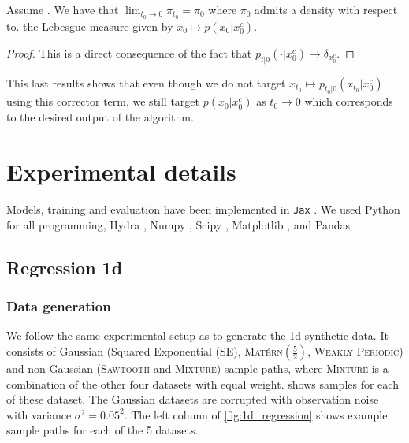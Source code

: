 \begin{proposition}
	Assume \textup{}.
	We have that $\lim_{t_0 \to 0} \pi_{t_0} = \pi_0$ where $\pi_0$ admits a density with respect to.
	the Lebesgue measure given by $x_0 \mapsto p(x_0|x_0^c)$.
\end{proposition}

\begin{proof}
	This is a direct consequence of the fact that $p_{t|0}(\cdot|x_0^c) \to \delta_{x_0^c}$.
\end{proof}

This last results shows that even though we do not target $x_{t_0} \mapsto p_{t_0|0}(x_{t_0} |x_0^c)$ using this corrector term, we still target $p(x_0 | x_0^c)$ as $t_0 \to 0$ which corresponds to the desired output of the algorithm.

\section{Experimental details}
\label{app:experimental_details}

Models, training and evaluation have been implemented in \texttt{Jax} \parencite{jax2018github}.
We used Python \parencite{van1995python} for all programming, Hydra \parencite{Yadan2019Hydra}, Numpy \parencite{harris2020}, Scipy \parencite{2020SciPy-NMeth}, Matplotlib \parencite{Hunter2007}, and Pandas \parencite{mckinney2010data}.

\subsection{Regression 1d}
\label{app:experimental_details_1d_regression}

\subsubsection{Data generation}

We follow the same experimental setup as \textcite{bruinsma2020Gaussian} to generate the 1d synthetic data.
It consists of Gaussian (Squared Exponential ({\scshape SE}), {\scshape Mat\'ern$(\tfrac52)$}, {\scshape Weakly Periodic}) and non-Gaussian ({\scshape Sawtooth} and {\scshape Mixture}) sample paths, where {\scshape Mixture} is a combination of the other four datasets with equal weight.
 shows samples for each of these dataset.
The Gaussian datasets are corrupted with observation noise with variance $\sigma^2=0.05^2$.
The left column of \cref{fig:1d_regression} shows example sample paths for each of the 5 datasets.


